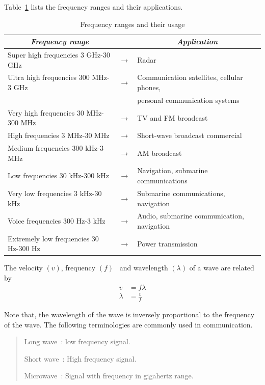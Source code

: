 Table~\ref{tab9.1} lists the frequency ranges and their applications.
\begin{table}[H]
\centering
\caption{Frequency ranges and their usage}\label{tab9.1}
\renewcommand{\arraystretch}{1.15}
{\fontsize{10pt}{12pt}\selectfont
\begin{tabular}{|lcl|}
\hline
\multicolumn{1}{|c}{\it\bfseries Frequency range} & & \multicolumn{1}{c|}{\it\bfseries Application}\\
\hline
Super high frequencies 3 GHz-30 GHz & $\to$ & Radar\\
\hline
Ultra high frequencies 300 MHz-3 GHz & $\to$ & Communication satellites, cellular phones,\\[-4pt]
 & & personal communication systems\\
\hline
Very high frequencies 30 MHz-300 MHz & $\to$ & TV and FM broadcast\\
\hline
High frequencies 3 MHz-30 MHz & $\to$ & Short-wave broadcast commercial\\
\hline
Medium frequencies 300 kHz-3 MHz & $\to$ & AM broadcast\\
\hline
Low frequencies 30 kHz-300 kHz & $\to$ & Navigation, submarine communications\\
\hline
Very low frequencies 3 kHz-30 kHz & $\to$ & Submarine communications, navigation\\
\hline
Voice frequencies 300 Hz-3 kHz & $\to$ & Audio, submarine communication, navigation\\
\hline
Extremely low frequencies 30 Hz-300 Hz & $\to$ & Power transmission\\
\hline
\end{tabular}}\relax
\end{table}

The velocity $(v)$, frequency $(f)$ \ and wavelength $(\lambda)$ of a wave are related by
\begin{align}
v &= f\lambda\label{eq9.2}\\[3pt]
\lambda &= \frac{v}{f}\label{eq9.3}
\end{align}

Note that, the wavelength of the wave is inversely proportional to the frequency of the wave. The following terminologies are commonly used in communication.
\begin{quote}
Long wave~: low frequency signal.

Short wave~: High frequency signal.

Microwave~: Signal with frequency in gigahertz range.\\[-20pt]
\end{quote}

